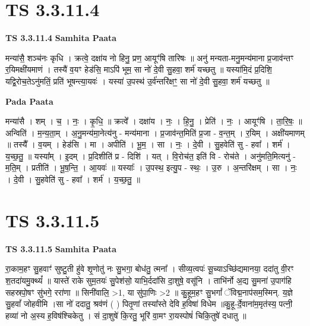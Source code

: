 \documentclass[17pt]{extarticle}
\begin{document}

\section{ TS 3.3.11.4 }

\textbf{TS 3.3.11.4 } \newline
\textbf{Samhita Paata} \newline

मन्या॑सै॒ शञ्च॑नः कृधि । क्रत्वे॒ दक्षा॑य नो हिनु॒ प्रण॒ आयूꣳ॑षि तारिषः ॥ अनु॑ मन्यता-मनु॒मन्य॑माना प्र॒जाव॑न्तꣳ र॒यिमक्षी॑यमाणं । तस्यै॑ व॒यꣳ हेड॑सि॒ माऽपि॑ भूम॒ सा नो॑ दे॒वी सु॒हवा॒ शर्म॑ यच्छतु ॥ यस्या॑मि॒दं प्र॒दिशि॒ यद्वि॒रोच॒तेऽनु॑मतिं॒ प्रति॑ भूषन्त्या॒यवः॑ । यस्या॑ उ॒पस्थ॑ उ॒र्व॑न्तरि॑क्षꣳ॒॒ सा नो॑ दे॒वी सु॒हवा॒ शर्म॑ यच्छतु ॥ \newline

\textbf{Pada Paata} \newline

मन्या॑सै । शम् । च॒ । नः॒ । कृ॒धि॒ ॥ क्रत्वे᳚ । दक्षा॑य । नः॒ । हि॒नु॒ । प्रेति॑ । नः॒ । आयूꣳ॑षि । ता॒रि॒षः॒ ॥ अन्विति॑ । म॒न्य॒ता॒म् । अ॒नु॒मन्य॑मा॒नेत्य॑नु - मन्य॑माना । प्र॒जाव॑न्त॒मिति॑ प्र॒जा - व॒न्त॒म् । र॒यिम् । अक्षी॑यमाणम् ॥ तस्यै᳚ । व॒यम् । हेड॑सि । मा । अपीति॑ । भू॒म॒ । सा । नः॒ । दे॒वी । सु॒हवेति॑ सु - हवा᳚ । शर्म॑ । य॒च्छ॒तु॒ ॥ यस्या᳚म् । इ॒दम् । प्र॒दिशीति॑ प्र - दिशि॑ । यत् । वि॒रोच॑त॒ इति॑ वि - रोच॑ते । अनु॑मति॒मित्यनु॑ - म॒ति॒म् । प्रतीति॑ । भू॒ष॒न्ति॒ । आ॒यवः॑ ॥ यस्याः᳚ । उ॒पस्थ॒ इत्यु॒प - स्थः॒ । उ॒रु । अ॒न्तरि॑क्षम् । सा । नः॒ । दे॒वी । सु॒हवेति॑ सु - हवा᳚ । शर्म॑ । य॒च्छ॒तु॒ ॥  \newline





\section{ TS 3.3.11.5 }

\textbf{TS 3.3.11.5 } \newline
\textbf{Samhita Paata} \newline

रा॒काम॒हꣳ सु॒हवाꣳ॑ सुष्टु॒ती हु॑वे शृ॒णोतु॑ नः सु॒भगा॒ बोध॑तु॒ त्मना᳚ । सीव्य॒त्वपः॑ सू॒च्याऽच्छि॑द्यमानया॒ ददा॑तु वी॒रꣳ श॒तदा॑यमु॒क्थ्यं᳚ ॥ यास्ते॑ राके सुम॒तयः॑ सु॒पेश॑सो॒ याभि॒र्ददा॑सि दा॒शुषे॒ वसू॑नि । ताभि॑र्नो अ॒द्य सु॒मना॑ उ॒पाग॑हि सहस्रपो॒षꣳ सु॑भगे॒ ररा॑णा ॥ सिनी॑वालि॒ >1, या सु॑पा॒णिः >2 ॥ कु॒हूम॒हꣳ सु॒भगां᳚ ॅविद्म॒नाप॑सम॒स्मिन्. य॒ज्ञे सु॒हवां᳚ जोहवीमि ।सा नो॑ ददातु॒ श्रव॑णं ( ) पितृ॒णां तस्या᳚स्ते देवि ह॒विषा॑ विधेम ॥कु॒हू-र्दे॒वाना॑म॒मृत॑स्य॒ पत्नी॒ हव्या॑ नो अ॒स्य ह॒विष॑श्चिकेतु । सं दा॒शुषे॑ कि॒रतु॒ भूरि॑ वा॒मꣳ रा॒यस्पोषं॑ चिकि॒तुषे॑ दधातु ॥ \newline
\end{document}
